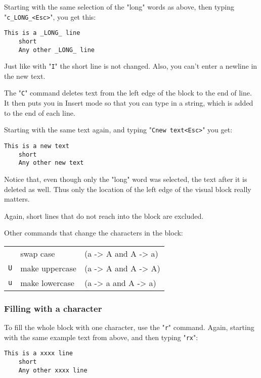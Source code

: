 Starting with the same selection of the "long" words as above, then typing "\texttt{c\_LONG\_<Esc>}", you get this:

\begin{Verbatim}[samepage=true]
    This is a _LONG_ line 
    short 
    Any other _LONG_ line 
\end{Verbatim}

Just like with "\texttt{I}" the short line is not changed.
Also, you can't enter a newline in the new text.

The "\texttt{C}" command deletes text from the left edge of the block to the end of line.
It then puts you in Insert mode so that you can type in a string, which is added to the end of each line.

Starting with the same text again, and typing "\texttt{Cnew text<Esc>}" you get:

\begin{Verbatim}[samepage=true]
    This is a new text 
    short 
    Any other new text 
\end{Verbatim}

Notice that, even though only the "long" word was selected, the text after it is deleted as well.
Thus only the location of the left edge of the visual block really matters.

Again, short lines that do not reach into the block are excluded.

Other commands that change the characters in the block:

\begin{center} \begin{tabular}{l l l}
	\texttt{~} & swap case & (a -> A and A -> a) \\
	\texttt{U} & make uppercase & (a -> A and A -> A) \\
	\texttt{u} & make lowercase & (a -> a and A -> a) \\
\end{tabular} \end{center}

\subsubsection{Filling with a character}
To fill the whole block with one character, use the "\texttt{r}" command.
Again, starting with the same example text from above, and then typing "\texttt{rx}":

\begin{Verbatim}[samepage=true]
    This is a xxxx line 
    short 
    Any other xxxx line 
\end{Verbatim}

